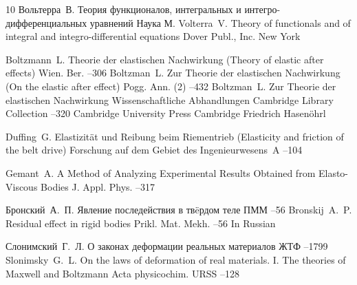 \begin{thebibliography}{10}
\by Вольтерра~В.
\book Теория функционалов, интегральных и интегро-дифференциальных уравнений
\publ Наука
\publaddr М.
\transl
\by Volterra~V.
\book Theory of functionals and of integral and integro-differential equations
\publ Dover Publ., Inc.
\publaddr New York

\by Boltzmann~L.
\paper Theorie der elastischen Nachwirkung (Theory of elastic after effects)
\jour Wien. Ber.
–306
\moreref
\by Boltzman~L.
\paper Zur Theorie der elastischen Nachwirkung (On the elastic after effect)
\jour Pogg. Ann. \rm (2)
--432
\moreref
\by Boltzman~L.
\paper Zur Theorie der elastischen Nachwirkung
\inbook Wissenschaftliche Abhandlungen
\serial Cambridge Library Collection
--320
\publ Cambridge University Press
\publaddr Cambridge
\ed Friedrich Hasen\"ohrl

\by Duffing~G.
\paper Elastizit\"at und Reibung beim Riementrieb (Elasticity and friction of the belt drive)
\jour Forschung auf dem Gebiet des Ingenieurwesens~A
--104

\by Gemant~A.
\paper A Method of Analyzing Experimental Results Obtained from Elasto-Viscous Bodies
\jour J. Appl. Phys.
--317

\by Бронский~А.~П.
\paper Явление последействия в тв\"eрдом теле
\jour ПММ
--56
\misctransl
\by Bronskij~A.~P.
\paper Residual effect in rigid bodies
\jour Prikl. Mat. Mekh.
--56
\lang In Russian

\by Слонимский~Г.~Л.
\paper О законах деформации реальных материалов
\jour ЖТФ
--1799
\transl
\by Slonimsky~G.~L.
\paper On the laws of deformation of real materials. I. The theories of Maxwell and Boltzmann
\jour Acta physicochim. URSS
--128


\end{thebibliography}
